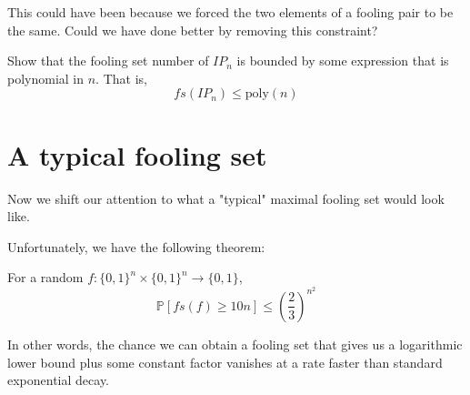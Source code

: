 \documentclass[letterpaper]{article}
\begin{document}
This could have been because we forced the two elements of a fooling pair to be the same.
Could we have done better by removing this constraint?

\begin{problem}
Show that the fooling set number of $IP_n$ is bounded by
some expression that is polynomial in $n$.
That is,
\[fs(IP_n) \le \text{poly}(n)\]
\end{problem}

\section{A typical fooling set}

Now we shift our attention to what a "typical" maximal fooling set would look like.

Unfortunately, we have the following theorem:
\begin{theorem}
    For a random $f: \{0, 1\}^n \times \{0, 1\}^n \to \{0, 1\}$,
    \[\mathbb{P}[fs(f) \ge 10n] \le \left(\frac{2}{3}\right)^{n^2}\]
\end{theorem}
In other words, the chance we can obtain a fooling set that
gives us a logarithmic lower bound plus some constant factor
vanishes at a rate faster than standard exponential decay.
\end{document}
